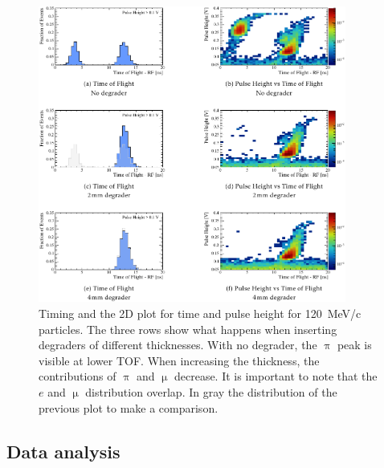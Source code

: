 \begin{refsection}
        \begin{figure}
            \centering
            \includegraphics[width=0.9\textwidth]{Figures/muEDM_Dec2021/muEDM_beamtime2021_TOF.png}
            \caption{Timing and the 2D plot for time and pulse height for \SI{120}{MeV/c} particles. The three rows show what happens when inserting degraders of different thicknesses.
            With no degrader, the $\uppi$ peak is visible at lower TOF.
            When increasing the thickness, the contributions of $\uppi$ and $\upmu$ decrease.
            It is important to note that the $e$ and $\upmu$ distribution overlap.
            In gray the distribution of the previous plot to make a comparison.}
            \label{fig:muEDM:beamtime2021:TOF}
        \end{figure}

    \subsection{Data analysis}

\end{refsection}
